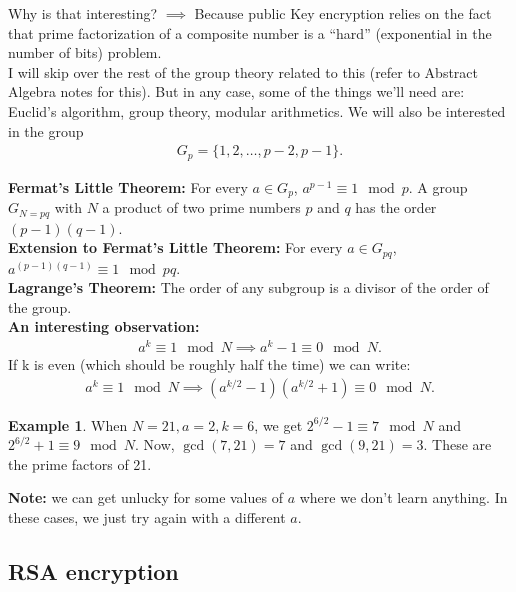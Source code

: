 \documentclass{book}
\theoremstyle{definition}
\newtheorem{exmp}{Example}[section]
\newcommand{\lp}{\left(}
\newcommand{\rp}{\right)}
\begin{document}
Why is that interesting? $\implies$ Because public Key encryption relies on the fact that prime factorization
of a composite number is a ``hard'' (exponential in the number of
bits) problem.\\


I will skip over the rest of the group theory related to this (refer to Abstract Algebra notes for this). But in any case, some of the things we'll need are: Euclid's algorithm, group theory, modular arithmetics. We will also be interested in the group 
\begin{align}
G_p = \{1,2,\dots, p-2,p-1\}. 
\end{align}

\noindent \textbf{Fermat's Little Theorem:} For every $a\in G_p$, $a^{p-1} \equiv 1 \mod p$. A group $G_{N=pq}$ with $N$ a product of two prime numbers $p$ and $q$ has the order $(p-1)(q-1)$. \\



\noindent \textbf{Extension to Fermat's Little Theorem:} For every $a \in G_{pq}$, $a^{(p-1)(q-1)} \equiv 1 \mod pq$. \\



\noindent \textbf{Lagrange's Theorem:} The order of any subgroup is a divisor of the order of the group. \\



\noindent \textbf{An interesting observation:} 
\begin{align}
a^k \equiv 1\mod N \implies a^k - 1 \equiv 0 \mod N.
\end{align}
If k is even (which should be roughly half the time) we can write:
\begin{align}
a^k \equiv 1\mod N \implies \lp a^{k/2}-1 \rp \lp a^{k/2} + 1 \rp \equiv 0 \mod N.
\end{align}

\begin{exmp}
	When $N=21, a=2, k=6$, we get $2^{6/2}-1 \equiv 7\mod N$ and $2^{6/2}+1 \equiv 9\mod N$. Now, $\gcd(7,21) = 7$ and $\gcd(9,21) = 3$. These are the prime factors of 21.   
\end{exmp}

\textbf{Note:} we can get unlucky for some values of $a$ where we don't learn anything. In these cases, we just try again with a different $a$. 


\subsection{RSA encryption}
\end{document}
